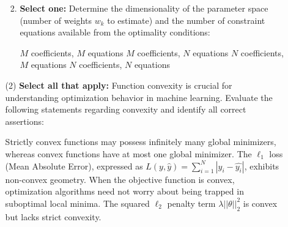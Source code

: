 \documentclass[11pt,addpoints,answers]{exam}
\newcommand{\sall}{\textbf{Select all that apply: }}
\newcommand{\sone}{\textbf{Select one: }}
\begin{document}
\begin{enumerate}
\begin{enumerate}[label=\alph*), itemsep=10pt]
\begin{enumerate}[label=(\roman*), leftmargin=*]
				
				\vspace*{7mm}
				
				\item \sone Determine the dimensionality of the parameter space (number of weights $w_k$ to estimate) and the number of constraint equations available from the optimality conditions:
				
				\begin{checkboxes}
					\choice $M$ coefficients, $M$ equations
					\choice $M$ coefficients, $N$ equations
					\choice $N$ coefficients, $M$ equations
					\choice $N$ coefficients, $N$ equations
				\end{checkboxes}
				
			\end{enumerate}
			
			\vspace*{7mm}
			\item[(2)] \sall Function convexity is crucial for understanding optimization behavior in machine learning. Evaluate the following statements regarding convexity and identify all correct assertions:
			
			\begin{checkboxes} \checkboxchar{$\Box$} \checkedchar{$\blacksquare$}
				\choice Strictly convex functions may possess infinitely many global minimizers, whereas convex functions have at most one global minimizer.
				\choice The $\ell_1$ loss (Mean Absolute Error), expressed as $L(y, \hat{y}) = \sum_{i=1}^N |y_i - \hat{y_i}|$, exhibits non-convex geometry.
				\choice When the objective function is convex, optimization algorithms need not worry about being trapped in suboptimal local minima.
				\choice The squared $\ell_2$ penalty term $\lambda ||\theta||_{2}^{2}$ is convex but lacks strict convexity.
			\end{checkboxes}
			
		\end{enumerate}
		
	\end{enumerate}
	\newpage	
	
\end{document}
